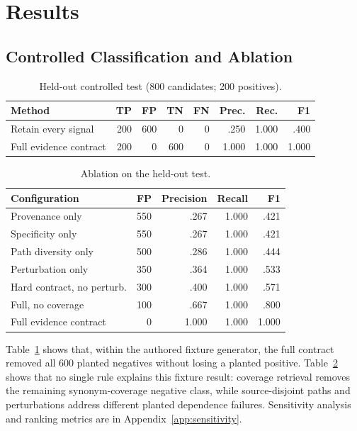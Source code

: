 \documentclass[conference, onecolumn]{IEEEtran}
\begin{document}
\section{Results}

\subsection{Controlled Classification and Ablation}

\begin{table}[t]
\caption{Held-out controlled test (800 candidates; 200 positives).}
\label{tab:controlled}
\centering
\begin{tabular}{lrrrrrrr}
\toprule
Method & TP & FP & TN & FN & Prec. & Rec. & F1\\
\midrule
Retain every signal & 200 & 600 & 0 & 0 & .250 & 1.000 & .400\\
Full evidence contract & 200 & 0 & 600 & 0 & 1.000 & 1.000 & 1.000\\
\bottomrule
\end{tabular}
\end{table}

\begin{table}[t]
\caption{Ablation on the held-out test.}
\label{tab:ablation}
\centering
\begin{tabular}{lrrrr}
\toprule
Configuration & FP & Precision & Recall & F1\\
\midrule
Provenance only & 550 & .267 & 1.000 & .421\\
Specificity only & 550 & .267 & 1.000 & .421\\
Path diversity only & 500 & .286 & 1.000 & .444\\
Perturbation only & 350 & .364 & 1.000 & .533\\
Hard contract, no perturb. & 300 & .400 & 1.000 & .571\\
Full, no coverage & 100 & .667 & 1.000 & .800\\
Full evidence contract & 0 & 1.000 & 1.000 & 1.000\\
\bottomrule
\end{tabular}
\end{table}

Table~\ref{tab:controlled} shows that, within the authored fixture generator, the full contract removed all 600 planted negatives without losing a planted positive. Table~\ref{tab:ablation} shows that no single rule explains this fixture result: coverage retrieval removes the remaining synonym-coverage negative class, while source-disjoint paths and perturbations address different planted dependence failures. Sensitivity analysis and ranking metrics are in Appendix~\ref{app:sensitivity}.
\end{document}
